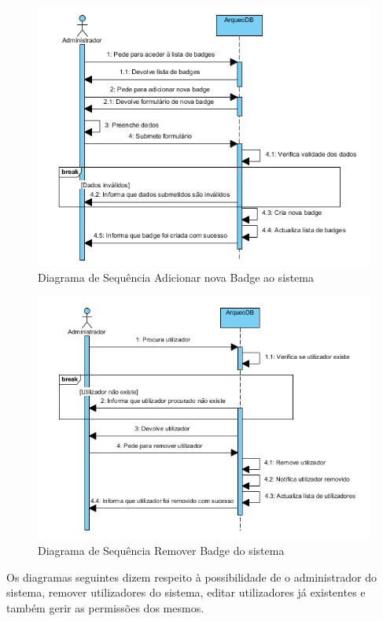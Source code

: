 ﻿\documentclass[12pt,a4paper]{article}
\begin{document}
\begin{figure}[h!]
\centering
\includegraphics[scale=1]{sequencia/A_criarbadge}
\caption{Diagrama de Sequência Adicionar nova Badge ao sistema} 
\end{figure}  

\begin{figure}[h!]
\centering
\includegraphics[scale=1]{sequencia/A_removerlocal}
\caption{Diagrama de Sequência Remover Badge do sistema} 
\end{figure}

\clearpage
Os diagramas seguintes dizem respeito à possibilidade de o administrador do sistema, remover utilizadores do sistema, editar utilizadores já existentes e também gerir as permissões dos mesmos.\\
\end{document}
